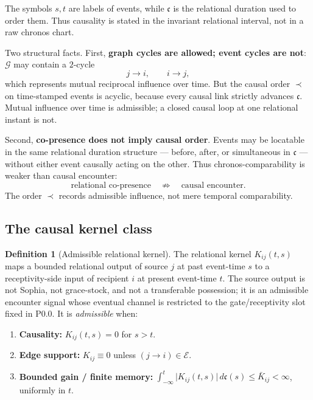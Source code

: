 \documentclass[11pt,a4paper]{article}
\theoremstyle{definition}
\newtheorem{definition}{Definition}[section]
\theoremstyle{plain}
\theoremstyle{remark}
\begin{document}
The symbols $s,t$ are labels of events, while $\mathfrak c$ is the relational
duration used to order them. Thus causality is stated in the invariant relational
interval, not in a raw chronos chart.

Two structural facts. First, \textbf{graph cycles are allowed; event cycles are
not}: \(\mathcal G\) may contain a \(2\)-cycle
\[
j\to i,
\qquad
i\to j,
\]
which represents mutual reciprocal influence over time. But the causal order
\(\prec\) on time-stamped events is acyclic, because every causal link strictly
advances \(\mathfrak c\). Mutual influence over time is admissible; a closed causal
loop at one relational instant is not.

Second, \textbf{co-presence does not imply causal order}. Events may be locatable
in the same relational duration structure --- before, after, or simultaneous in
\(\mathfrak c\) --- without either event causally acting on the other. Thus
chronos-comparability is weaker than causal encounter:
\[
\text{relational co-presence}
\quad\not\Rightarrow\quad
\text{causal encounter}.
\]
The order \(\prec\) records admissible influence, not mere temporal comparability.

\subsection{The causal kernel class}

\begin{definition}[Admissible relational kernel]
The relational kernel $K_{ij}(t,s)$ maps a bounded relational output of source $j$
at past event-time $s$ to a receptivity-side input of recipient $i$ at present
event-time $t$. The source output is not Sophia, not grace-stock, and not a
transferable possession; it is an admissible encounter signal whose eventual channel
is restricted to the gate/receptivity slot fixed in P0.0. It is
\emph{admissible} when:
\begin{enumerate}[label=\textup{(K\arabic*)},leftmargin=1.5cm]
\item \textbf{Causality:} $K_{ij}(t,s)=0$ for $s>t$.
\item \textbf{Edge support:} $K_{ij}\equiv0$ unless $(j\!\to\!i)\in\mathcal E$.
\item \textbf{Bounded gain / finite memory:} $\displaystyle\int_{-\infty}^{t}\bigl|K_{ij}(t,s)\bigr|\,d\mathfrak c(s)\le\bar K_{ij}<\infty$, uniformly in $t$.
\end{enumerate}
\end{definition}
\end{document}
